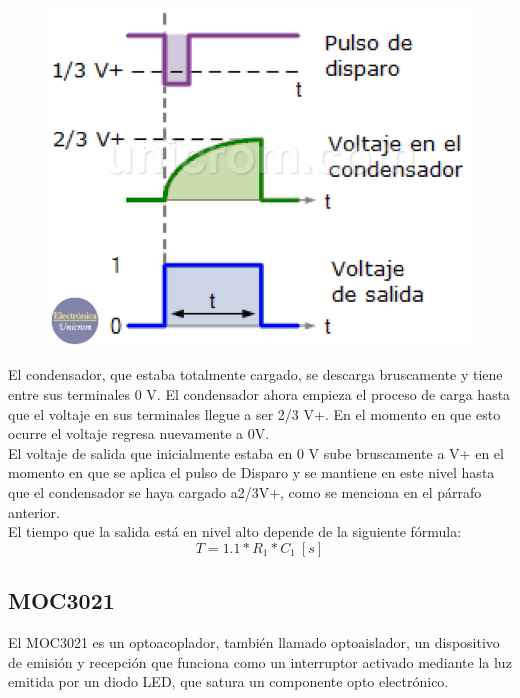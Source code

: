\documentclass[osajnl,twocolumn,showpacs,superscriptaddress,10pt]{revtex4-1}
\begin{document}
\begin{figure}[H]
\centering
\includegraphics[width = \columnwidth]{Fig_2.png}
\caption{}
\end{figure}

El condensador, que estaba totalmente cargado, se descarga bruscamente y tiene entre sus terminales 0 V. El condensador ahora empieza el proceso de carga hasta que el voltaje en sus terminales llegue a ser 2/3 V+. En el momento en que esto ocurre el voltaje regresa nuevamente a 0V.\\

El voltaje de salida que inicialmente estaba en 0 V sube bruscamente a V+ en el momento en que se aplica el pulso de Disparo y se mantiene en este nivel hasta que el condensador se haya cargado a2/3V+, como se menciona en el párrafo anterior.\\

El tiempo que la salida está en nivel alto depende de la siguiente fórmula:\\

\begin{equation}
T = 1.1 * R_{1} * C_{1} \ [s]
\end{equation}

\subsection{MOC3021}

El MOC3021 es un optoacoplador, también llamado
optoaislador, un dispositivo de emisión y recepción que funciona como un interruptor activado mediante la luz emitida por un diodo LED, que satura un componente opto electrónico.\\
\end{document}
